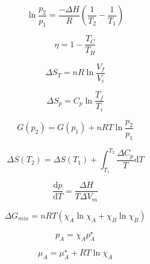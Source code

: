 \documentclass[12pt, letterpaper]{memoir}
\begin{document}
\begin{equation*}
	\ln\dfrac{p_2}{p_1}=\dfrac{-\Delta H}{R}\left(\dfrac{1}{T_2}-\dfrac{1}{T_1}\right)
\end{equation*}

\noindent
\begin{minipage}[t]{0.5\linewidth}


	\begin{equation*}
		\eta = 1 - \dfrac{T_C}{T_H}
	\end{equation*}

	\begin{equation*}
		\Delta S_T=nR\ln\dfrac{V_f}{V_i}
	\end{equation*}

	\begin{equation*}
		\Delta S_p=C_p\ln\dfrac{T_f}{T_i}
	\end{equation*}

	\begin{equation*}
		G(p_2) = G(p_1)+nRT\ln\dfrac{p_2}{p_1}
	\end{equation*}

	\begin{equation*}
		\Delta S(T_2) = \Delta S(T_1) + \int_{T_1}^{T_2} \! \dfrac{\Delta C_{p}}{T}\mathrm{d}T
	\end{equation*}

	\begin{equation*}
		\dfrac{\mathrm{d}p}{\mathrm{d}T}=\dfrac{\Delta H}{T\Delta V_m}
	\end{equation*}

	\begin{equation*}
		\Delta G_{mix} = nRT\left(\chi_A\ln\chi_A+\chi_B\ln\chi_B\right)
	\end{equation*}

	\begin{equation*}
		p_A=\chi_Ap^{\star}_A
	\end{equation*}

	\begin{equation*}
		\mu_A=\mu_A^{\star}+RT\ln\chi_A
	\end{equation*}



\end{minipage}
\end{document}
